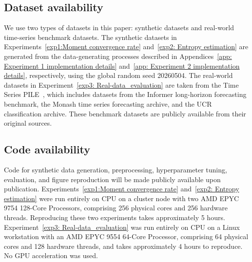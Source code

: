 \documentclass[12pt]{article}
\theoremstyle{definition}
\begin{document}
\subsection{Dataset availability}\label{Appendix: Dataset_availability}
We use two types of datasets in this paper: synthetic datasets and real-world time-series benchmark datasets. The synthetic datasets in Experiments~\ref{exp1:Moment convergence rate} and~\ref{exp2: Entropy estimation} are generated from the data-generating processes described in Appendices~\ref{app: Experiment 1 implementation details} and~\ref{app: Experiment 2 implementation details}, respectively, using the global random seed 20260504. The real-world datasets in Experiment~\ref{exp3: Real-data_evaluation} are taken from the Time Series PILE~\citep{goswami2024moment}, which includes datasets from the Informer long-horizon forecasting benchmark, the Monash time series forecasting archive, and the UCR classification archive. These benchmark datasets are publicly available from their original sources.

\subsection{Code availability}\label{Appendix: Code_availability}
Code for synthetic data generation, preprocessing, hyperparameter tuning, evaluation, and figure reproduction will be made publicly available upon publication. Experiments~\ref{exp1:Moment convergence rate} and~\ref{exp2: Entropy estimation} were run entirely on CPU on a cluster node with two AMD EPYC 9754 128-Core Processors, comprising 256 physical cores and 256 hardware threads. Reproducing these two experiments takes approximately 5 hours. Experiment~\ref{exp3: Real-data_evaluation} was run entirely on CPU on a Linux workstation with an AMD EPYC 9554 64-Core Processor, comprising 64 physical cores and 128 hardware threads, and takes approximately 4 hours to reproduce. No GPU acceleration was used.
\end{document}
